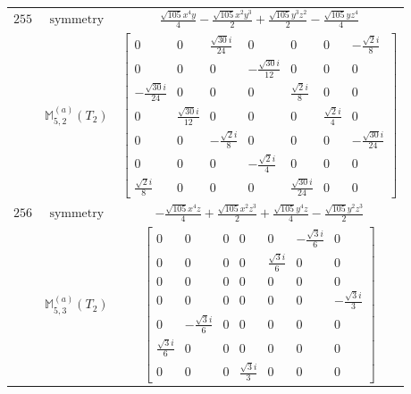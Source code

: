 \documentclass[fleqn,8pt,landscape]{jsarticle}
\begin{document}
\begin{longtable}{ccc}
$ 255 $ & $ \text{symmetry} $ & $ \frac{\sqrt{105} x^{4} y}{4} - \frac{\sqrt{105} x^{2} y^{3}}{2} + \frac{\sqrt{105} y^{3} z^{2}}{2} - \frac{\sqrt{105} y z^{4}}{4} $ \\
$  $ & $ \mathbb{M}_{5,2}^{(a)}(T_{2}) $ & $ \begin{bmatrix} 0 & 0 & \frac{\sqrt{30} i}{24} & 0 & 0 & 0 & - \frac{\sqrt{2} i}{8} \\ 0 & 0 & 0 & - \frac{\sqrt{30} i}{12} & 0 & 0 & 0 \\ - \frac{\sqrt{30} i}{24} & 0 & 0 & 0 & \frac{\sqrt{2} i}{8} & 0 & 0 \\ 0 & \frac{\sqrt{30} i}{12} & 0 & 0 & 0 & \frac{\sqrt{2} i}{4} & 0 \\ 0 & 0 & - \frac{\sqrt{2} i}{8} & 0 & 0 & 0 & - \frac{\sqrt{30} i}{24} \\ 0 & 0 & 0 & - \frac{\sqrt{2} i}{4} & 0 & 0 & 0 \\ \frac{\sqrt{2} i}{8} & 0 & 0 & 0 & \frac{\sqrt{30} i}{24} & 0 & 0 \end{bmatrix} $ \\ \hline
$ 256 $ & $ \text{symmetry} $ & $ - \frac{\sqrt{105} x^{4} z}{4} + \frac{\sqrt{105} x^{2} z^{3}}{2} + \frac{\sqrt{105} y^{4} z}{4} - \frac{\sqrt{105} y^{2} z^{3}}{2} $ \\
$  $ & $ \mathbb{M}_{5,3}^{(a)}(T_{2}) $ & $ \begin{bmatrix} 0 & 0 & 0 & 0 & 0 & - \frac{\sqrt{3} i}{6} & 0 \\ 0 & 0 & 0 & 0 & \frac{\sqrt{3} i}{6} & 0 & 0 \\ 0 & 0 & 0 & 0 & 0 & 0 & 0 \\ 0 & 0 & 0 & 0 & 0 & 0 & - \frac{\sqrt{3} i}{3} \\ 0 & - \frac{\sqrt{3} i}{6} & 0 & 0 & 0 & 0 & 0 \\ \frac{\sqrt{3} i}{6} & 0 & 0 & 0 & 0 & 0 & 0 \\ 0 & 0 & 0 & \frac{\sqrt{3} i}{3} & 0 & 0 & 0 \end{bmatrix} $ \\ \hline
\end{longtable}
\end{document}

